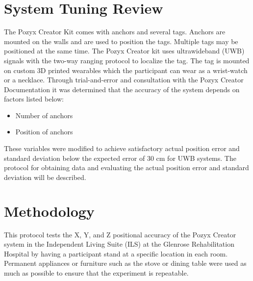 \section{System Tuning Review}
The Pozyx Creator Kit comes with anchors and several tags. Anchors are mounted 
on the walls and are used to position the tags. Multiple tags may be positioned
at the same time.
The Pozyx Creator kit uses ultrawideband (UWB) signals with the two-way ranging protocol to localize the tag. 
The tag is mounted on custom 3D printed wearables which the participant can wear as 
a wrist-watch or a necklace. Through trial-and-error and consultation with the Pozyx Creator Documentation
\cite{noauthor_hardware_nodate,noauthor_configuration_nodate}
it was determined that the accuracy of the system depends on factors listed below:

\begin{itemize}
    \item Number of anchors
    \item Position of anchors
\end{itemize}

These variables were modified to achieve satisfactory actual position error
and standard deviation below the expected error of 30 cm for UWB systems. The 
protocol for obtaining data and evaluating the actual position error and 
standard deviation will be described.

\section{Methodology}
This protocol tests the X, Y, and Z positional accuracy of the Pozyx Creator system in the Independent
Living Suite (ILS) at the Glenrose Rehabilitation Hospital by having a participant stand at 
a specific location in each room. Permanent appliances or furniture such as the stove
or dining table were used as much as possible to ensure that the experiment is repeatable.

